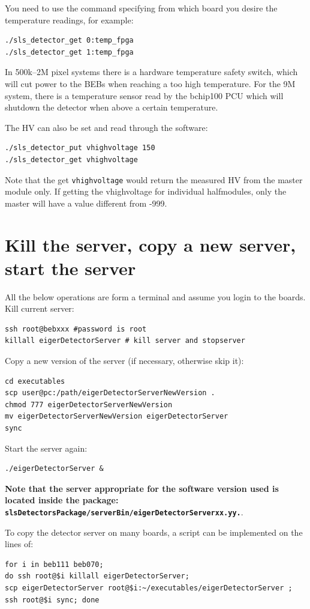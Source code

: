 \documentclass{article}
\begin{document}
You need to use the command specifying from which board you desire the temperature readings, for example:
\begin{verbatim}
./sls_detector_get 0:temp_fpga
./sls_detector_get 1:temp_fpga
\end{verbatim}
In 500k--2M pixel systems there is a hardware temperature safety switch, which will cut power to the BEBs when reaching a too high temperature. For the 9M system, there is a temperature sensor read by the bchip100 PCU which will shutdown the detector when above a certain temperature.
 
The HV can also be set and read through the software:
\begin{verbatim}
./sls_detector_put vhighvoltage 150
./sls_detector_get vhighvoltage 
\end{verbatim}
Note that the get {\tt{vhighvoltage}} would return the measured HV from the master module only. If getting the vhighvoltage for individual halfmodules, only the master will have a value different from -999.

\appendix

\section{Kill the server, copy a new server, start the server}\label{server}
All the below operations are form a terminal and assume you login to the boards.\\
Kill current server:
\begin{verbatim}
ssh root@bebxxx #password is root
killall eigerDetectorServer # kill server and stopserver
\end{verbatim}
Copy a new version of the server (if necessary, otherwise skip it):
\begin{verbatim}
cd executables
scp user@pc:/path/eigerDetectorServerNewVersion .
chmod 777 eigerDetectorServerNewVersion
mv eigerDetectorServerNewVersion eigerDetectorServer
sync
\end{verbatim}
Start the server again:
\begin{verbatim}
./eigerDetectorServer &
\end{verbatim}
\textbf{Note that the server appropriate for the software version used is located inside the package: {\tt{slsDetectorsPackage/serverBin/eigerDetectorServerxx.yy.}}}.

To copy the detector server on many boards, a script can be implemented on the lines of:
\begin{verbatim}
for i in beb111 beb070; 
do ssh root@$i killall eigerDetectorServer; 
scp eigerDetectorServer root@$i:~/executables/eigerDetectorServer ; 
ssh root@$i sync; done
\end{verbatim}
\end{document}
